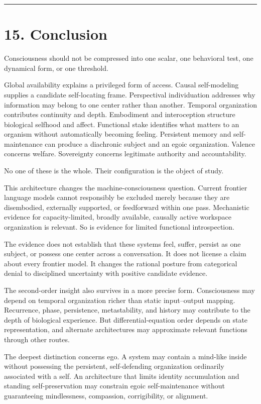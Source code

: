 \documentclass[
  11pt,
]{article}
\begin{document}
\begin{center}\rule{0.5\linewidth}{0.5pt}\end{center}

\section{15. Conclusion}\label{conclusion}

Consciousness should not be compressed into one scalar, one behavioral
test, one dynamical form, or one threshold.

Global availability explains a privileged form of access. Causal
self-modeling supplies a candidate self-locating frame. Perspectival
individuation addresses why information may belong to one center rather
than another. Temporal organization contributes continuity and depth.
Embodiment and interoception structure biological selfhood and affect.
Functional stake identifies what matters to an organism without
automatically becoming feeling. Persistent memory and self-maintenance
can produce a diachronic subject and an egoic organization. Valence
concerns welfare. Sovereignty concerns legitimate authority and
accountability.

No one of these is the whole. Their configuration is the object of
study.

This architecture changes the machine-consciousness question. Current
frontier language models cannot responsibly be excluded merely because
they are disembodied, externally supported, or feedforward within one
pass. Mechanistic evidence for capacity-limited, broadly available,
causally active workspace organization is relevant. So is evidence for
limited functional introspection.

The evidence does not establish that these systems feel, suffer, persist
as one subject, or possess one center across a conversation. It does not
license a claim about every frontier model. It changes the rational
posture from categorical denial to disciplined uncertainty with positive
candidate evidence.

The second-order insight also survives in a more precise form.
Consciousness may depend on temporal organization richer than static
input--output mapping. Recurrence, phase, persistence, metastability,
and history may contribute to the depth of biological experience. But
differential-equation order depends on state representation, and
alternate architectures may approximate relevant functions through other
routes.

The deepest distinction concerns ego. A system may contain a mind-like
inside without possessing the persistent, self-defending organization
ordinarily associated with a self. An architecture that limits identity
accumulation and standing self-preservation may constrain egoic
self-maintenance without guaranteeing mindlessness, compassion,
corrigibility, or alignment.
\end{document}
